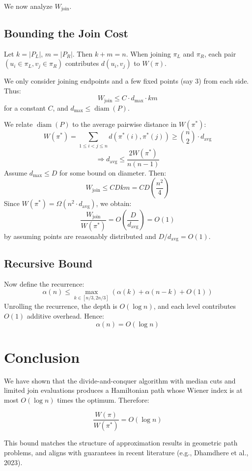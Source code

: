 \documentclass[11pt]{article}
\begin{document}
We now analyze $W_{\text{join}}$.

\subsection{Bounding the Join Cost}

Let $k = |P_L|$, $m = |P_R|$. Then $k + m = n$. When joining $\pi_L$ and $\pi_R$, each pair $(u_i \in \pi_L, v_j \in \pi_R)$ contributes $d(u_i, v_j)$ to $W(\pi)$.

We only consider joining endpoints and a few fixed points (say 3) from each side. Thus:
\[
  W_{\text{join}} \leq C \cdot d_{\max} \cdot km
\]
for a constant $C$, and $d_{\max} \leq \operatorname{diam}(P)$.

We relate $\operatorname{diam}(P)$ to the average pairwise distance in $W(\pi^*)$:
\[
  W(\pi^*) = \sum_{1 \leq i < j \leq n} d(\pi^*(i), \pi^*(j)) \geq \binom{n}{2} \cdot d_{\text{avg}}
\]
\[
  \Rightarrow d_{\text{avg}} \leq \frac{2W(\pi^*)}{n(n-1)}
\]
Assume $d_{\max} \leq D$ for some bound on diameter. Then:
\[
  W_{\text{join}} \leq C D k m = C D \left(\frac{n^2}{4}\right)
\]
Since $W(\pi^*) = \Omega(n^2 \cdot d_{\text{avg}})$, we obtain:
\[
  \frac{W_{\text{join}}}{W(\pi^*)} = O\left(\frac{D}{d_{\text{avg}}}\right) = O(1)
\]
by assuming points are reasonably distributed and $D/d_{\text{avg}} = O(1)$.

\subsection{Recursive Bound}

Now define the recurrence:
\[
  \alpha(n) \leq \max_{k \in [n/3, 2n/3]}\left( \alpha(k) + \alpha(n-k) + O(1) \right)
\]
Unrolling the recurrence, the depth is $O(\log n)$, and each level contributes $O(1)$ additive overhead. Hence:
\[
  \alpha(n) = O(\log n)
\]

\section{Conclusion}

We have shown that the divide-and-conquer algorithm with median cuts and limited join evaluations produces a Hamiltonian path whose Wiener index is at most $O(\log n)$ times the optimum. Therefore:

\[
  \boxed{\frac{W(\pi)}{W(\pi^*)} = O(\log n)}
\]

This bound matches the structure of approximation results in geometric path problems, and aligns with guarantees in recent literature (e.g., Dhamdhere et al., 2023).
\end{document}
